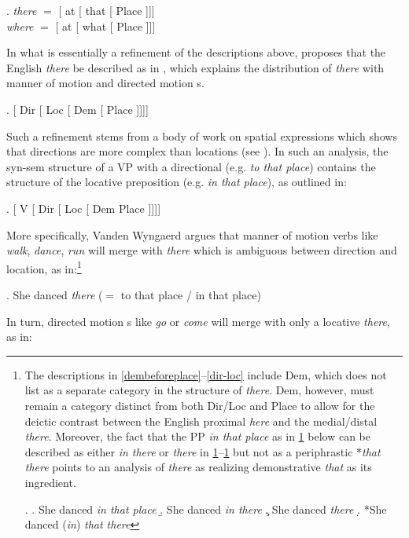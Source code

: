 \ex. \label{Kayne}
\textit{there} $=$ [ at [ that [ Place ]]]\\
\textit{where} $=$ [ at [ what [ Place ]]]
 
\noindent In what is essentially a refinement of the descriptions above, \cite{GVW-Olinco} proposes that the English \textit{there} be described as in \Next, which explains the distribution of \textit{there} with manner of motion and directed motion s.

\ex. [ Dir [ Loc [ Dem [ Place ]]]]\label{dembeforeplace}

Such a refinement stems from a body of work on spatial expressions which shows that directions are more complex than locations (see \citealt{Koopman2000,Kracht2002,Zwarts2005,Cinque2010,Svenonius2010,DenDikken2010,Pantcheva2011}). In such an analysis, the syn-sem structure of a VP with a directional  (e.g. \textit{to that place}) contains the structure of the locative preposition (e.g. \textit{in that place}), as outlined in:

\ex.\label{dir-loc} [ V [ Dir [ Loc [ Dem Place ]]]]

\noindent More specifically, Vanden Wyngaerd argues that manner of motion verbs like \textit{walk}, \textit{dance}, \textit{run} will merge with \textit{there} which is ambiguous between direction and location, as in:\footnote{The descriptions in \ref{dembeforeplace}--\ref{dir-loc} include Dem, which \cite{GVW-Olinco} does not list as a separate category in the structure of \textit{there}. Dem, however, must remain a category distinct from both Dir/Loc and Place to allow for the deictic contrast between the English proximal \textit{here} and the medial/distal \textit{there}. Moreover,  the fact that the PP \textit{in that place} as in \ref{itp} below can be described as either \textit{in there} or \textit{there} in \ref{it}--\ref{solothere} but not as a periphrastic *\textit{that there} points to an analysis of \textit{there} as realizing demonstrative \textit{that} as its ingredient.

\ex. 
\a. She danced \textit{in that place}\label{itp}
\b. She danced \textit{in there}\label{it}
\c. She danced \textit{there}\label{solothere}
\d. *She danced (\textit{in}) \textit{that there}

}%


\ex. She danced \textit{there} ($=$ to that place / in that place)\label{shedanced}

In turn, directed motion s like \textit{go} or \textit{come} will merge with only a locative \textit{there}, as in:

